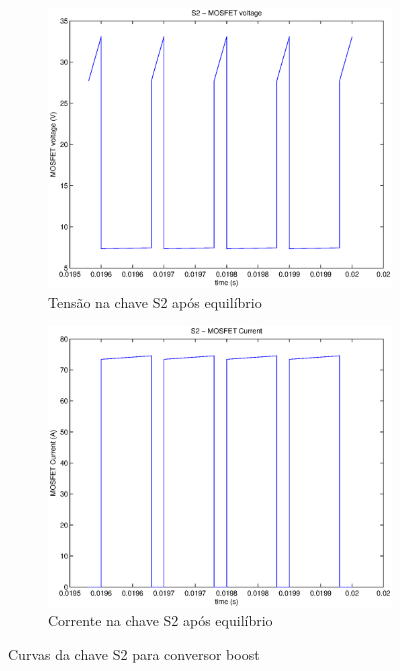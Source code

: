 \documentclass{article}
\begin{document}
\begin{figure}[H]
\begin{subfigure}[b]{0.4\linewidth}
		\includegraphics[width=\linewidth]{matlab/boost/r_s2vst}
		\caption{Tensão na chave S2 após equilíbrio}
	\end{subfigure}
	\begin{subfigure}[b]{0.4\linewidth}
		\centering
		\includegraphics[width=\linewidth]{matlab/boost/r_s2ist}
		\caption{Corrente na chave S2 após equilíbrio}
	\end{subfigure}
	\caption{Curvas da chave S2 para conversor boost}
	\label{fig:bos2}
\end{figure}
\end{document}
